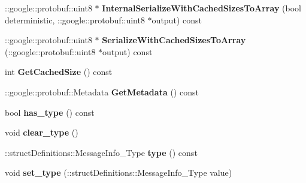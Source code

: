 \begin{DoxyCompactItemize}
\item 
\hypertarget{classstruct_definitions_1_1_message_info_a6fc3fd3d93aa40e21d53a9c8a78fc700}{}\label{classstruct_definitions_1_1_message_info_a6fc3fd3d93aa40e21d53a9c8a78fc700} 
\+::google\+::protobuf\+::uint8 $\ast$ {\bfseries Internal\+Serialize\+With\+Cached\+Sizes\+To\+Array} (bool deterministic, \+::google\+::protobuf\+::uint8 $\ast$output) const
\item 
\hypertarget{classstruct_definitions_1_1_message_info_aadea621b610eed19957744f7c83720d5}{}\label{classstruct_definitions_1_1_message_info_aadea621b610eed19957744f7c83720d5} 
\+::google\+::protobuf\+::uint8 $\ast$ {\bfseries Serialize\+With\+Cached\+Sizes\+To\+Array} (\+::google\+::protobuf\+::uint8 $\ast$output) const
\item 
\hypertarget{classstruct_definitions_1_1_message_info_ab9736a5140d10dfdaa4d72a4ec641782}{}\label{classstruct_definitions_1_1_message_info_ab9736a5140d10dfdaa4d72a4ec641782} 
int {\bfseries Get\+Cached\+Size} () const
\item 
\hypertarget{classstruct_definitions_1_1_message_info_a3a05c02f41e3f565087ab03967b4227d}{}\label{classstruct_definitions_1_1_message_info_a3a05c02f41e3f565087ab03967b4227d} 
\+::google\+::protobuf\+::\+Metadata {\bfseries Get\+Metadata} () const
\item 
\hypertarget{classstruct_definitions_1_1_message_info_a803697e54e9256b346dd037e97d9d005}{}\label{classstruct_definitions_1_1_message_info_a803697e54e9256b346dd037e97d9d005} 
bool {\bfseries has\+\_\+type} () const
\item 
\hypertarget{classstruct_definitions_1_1_message_info_a8ba2e6ed17935ce5740ee133fb58f1f0}{}\label{classstruct_definitions_1_1_message_info_a8ba2e6ed17935ce5740ee133fb58f1f0} 
void {\bfseries clear\+\_\+type} ()
\item 
\hypertarget{classstruct_definitions_1_1_message_info_afc3ef771952889590f697c50f5034341}{}\label{classstruct_definitions_1_1_message_info_afc3ef771952889590f697c50f5034341} 
\+::struct\+Definitions\+::\+Message\+Info\+\_\+\+Type {\bfseries type} () const
\item 
\hypertarget{classstruct_definitions_1_1_message_info_a31b33678eca1542072180e8ffd0b3f10}{}\label{classstruct_definitions_1_1_message_info_a31b33678eca1542072180e8ffd0b3f10} 
void {\bfseries set\+\_\+type} (\+::struct\+Definitions\+::\+Message\+Info\+\_\+\+Type value)
\end{DoxyCompactItemize}
